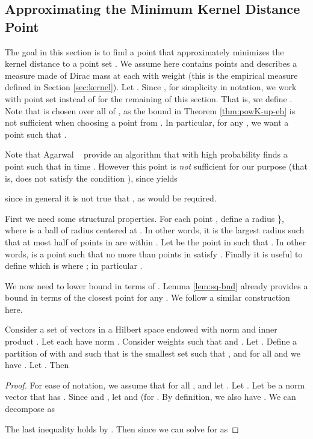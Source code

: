 \documentclass[11pt]{myclass}
\begin{document}
\subsection{Approximating the Minimum Kernel Distance Point}
\label{app:phat+}
The goal in this section is to find a point that approximately minimizes the kernel distance to a point set .  We assume here  contains  points and describes a measure made of  Dirac mass at each  with weight  (this is the empirical measure  defined in Section \ref{sec:kernel}).  
Let . 
Since , for simplicity in notation, we work with point set  instead of  for the remaining of this section. 
That is, we define .  
Note that  is chosen over all of , as the bound in Theorem \ref{thm:powK-up-eh} is not sufficient when choosing a point from .  
In particular, for any , we want a point  such that .  

Note that Agarwal \etal~\cite{AHKS13} provide an algorithm that with high probability finds a point  such that  in time .  However this point  is \emph{not} sufficient for our purpose
(that is,  does not satisfy the condition  ),  since  yields  

since in general it is not true that , as would be required.  

First we need some structural properties. 
For each point , define a radius \}, where  is a ball of radius  centered at .  In other words, it is the largest radius such that at most half of points in  are within .  
Let  be the point in  such that .  
In other words,  is a point such that no more than  points in  satisfy .  
Finally it is useful to define  which is  where ; in particular .  

We now need to lower bound  in terms of .
Lemma \ref{lem:sq-bnd} already provides a bound in terms of the closest point for any .  We follow a similar construction here.  


\begin{lemma}
\label{lem:vec-shrink2}
Consider a set  of vectors in a Hilbert space endowed with norm  and inner product .  Let each  have norm .  
Consider weights  such that  and .  Let .  Define a partition of  with  and  such that  is the smallest set such that , and for all  and  we have .  Let .
Then
 
\end{lemma}
\begin{proof}
For ease of notation, we assume that  for all , and let .    Let .  
Let  be a norm  vector that has .
Since   and , 
let  and  (for . 
By definition, we also have . 
We can decompose  as 

The last inequality holds by .  
Then since  we can solve for  as 

\end{proof}
\end{document}
